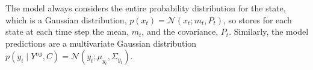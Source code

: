 \documentclass{article}
\newcommand{\norm}[3]{\mathcal{N}\left(#1; #2, #3\right)} %
\begin{document}
The model always considers the entire probability distribution for the state, which is a Gaussian distribution,  $p(x_t) = \norm{x_t}{m_t}{P_t}$, so stores for each state at each time step the mean, $m_t$, and the covariance, $P_t$. Similarly, the model predictions are a multivariate Gaussian distribution $p(y_t \mid Y^{ng}, C) =  \norm{y_t}{\mu_{y_t}}{\Sigma_{y_t}}$.








\end{document}
